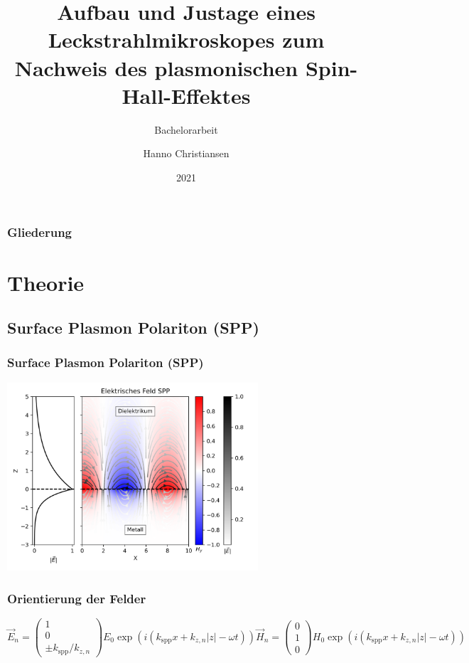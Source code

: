 \documentclass[aspectratio=1610]{beamer}
\title{Aufbau und Justage eines Leckstrahlmikroskopes zum Nachweis des plasmonischen Spin-Hall-Effektes}
\subtitle{Bachelorarbeit}
\author{Hanno Christiansen}
\institute{Christian-Albrechts-Universität zu Kiel}
\date{2021}
\begin{document}
	
	\frame{\titlepage}
	
	\begin{frame}
		\frametitle{Gliederung}
		\tableofcontents
	\end{frame}

	\section{Theorie}
		\subsection{Surface Plasmon Polariton (SPP)}	
		\begin{frame}
			\frametitle{Surface Plasmon Polariton (SPP)}	
				\begin{center}
					\includegraphics[width=0.7\textwidth]{figures/E_Feld_SPP.png}	
				\end{center}			
		\end{frame}
	
		\begin{frame}
			\frametitle{Orientierung der Felder}
				\begin{subequations}
				\begin{equation}
					\vec{E}_n = \begin{pmatrix} 1 \\ 0 \\ \pm k_{\mathrm{spp}}/k_{z,n} \end{pmatrix} E_0 \exp\left(i(k_{\mathrm{spp}}x + k_{z, n}|z|-\omega t)\right)	
				\end{equation}
				\begin{equation}
					\vec{H}_n = \begin{pmatrix} 0 \\ 1 \\ 0 \end{pmatrix} H_0 \exp\left(i(k_{\mathrm{spp}}x + k_{z, n}|z|-\omega t)\right)
				\end{equation}
			\end{subequations}
		\end{frame}
	
\end{document}
